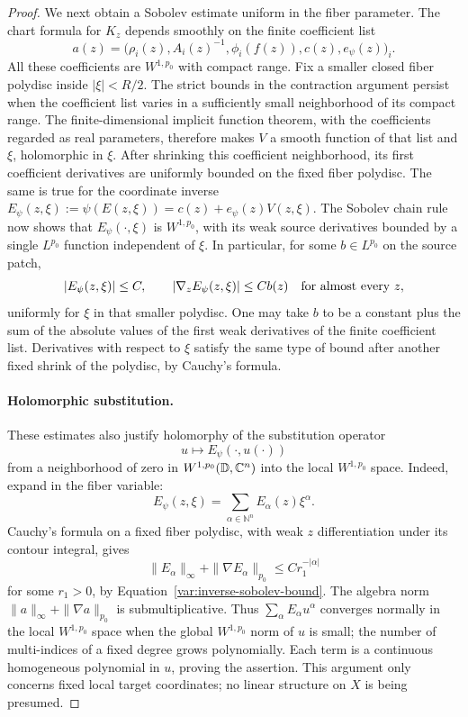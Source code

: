 \begin{proof}
We next obtain a Sobolev estimate uniform in the fiber parameter.
The chart formula for $K_z$ depends smoothly on the finite coefficient list
\[
 a(z)=\bigl(\rho_i(z),A_i(z)^{-1},\phi_i(f(z)),
                 c(z),e_\psi(z)\bigr)_i.
\]
All these coefficients are $W^{1,p_0}$ with compact range.  Fix a
smaller closed fiber polydisc inside $|\xi|<R/2$.  The strict bounds
in the contraction argument persist when the coefficient list varies
in a sufficiently small neighborhood of its compact range.  The
finite-dimensional implicit function theorem, with the coefficients
regarded as real parameters, therefore makes $V$ a smooth function of
that list and $\xi$, holomorphic in $\xi$.  After shrinking this
coefficient neighborhood, its first coefficient derivatives are
uniformly bounded on the fixed fiber polydisc.  The same is true for
the coordinate inverse
$E_\psi(z,\xi):=\psi(E(z,\xi))=c(z)+e_\psi(z)V(z,\xi)$.
The Sobolev chain rule now shows that $E_\psi(\cdot,\xi)$ is
$W^{1,p_0}$, with its weak source derivatives bounded by a single
$L^{p_0}$ function independent of $\xi$.  In particular, for some
$b\in L^{p_0}$ on the source patch,
\begin{equation}\label{var:inverse-sobolev-bound}
 |E_\psi(z,\xi)|\le C,
 \qquad |\nabla_zE_\psi(z,\xi)|\le C b(z)
 \quad\hbox{for almost every }z,
\end{equation}
uniformly for $\xi$ in that smaller polydisc.  One may take $b$ to
be a constant plus the sum of the absolute values of the first weak
derivatives of the finite coefficient list.  Derivatives with respect
to $\xi$ satisfy the same type of bound after another fixed shrink
of the polydisc, by Cauchy's formula.

\paragraph{Holomorphic substitution.}
These estimates also justify holomorphy of the substitution operator
\begin{equation}\label{var:inverse-substitution}
 u\longmapsto E_\psi(\cdot,u(\cdot))
\end{equation}
from a neighborhood of zero in $W^{1,p_0}(\mathbb D,\mathbb C^n)$ into the local
$W^{1,p_0}$ space.  Indeed, expand in the fiber variable:
\[
 E_\psi(z,\xi)=\sum_{\alpha\in\mathbb N^n}E_\alpha(z)\xi^\alpha.
\]
Cauchy's formula on a fixed fiber polydisc, with weak $z$
differentiation under its contour integral, gives
\[
 \|E_\alpha\|_\infty+\|\nabla E_\alpha\|_{p_0}
       \le Cr_1^{-|\alpha|}
\]
for some $r_1>0$, by Equation~\eqref{var:inverse-sobolev-bound}.
The algebra norm $\|a\|_\infty+\|\nabla a\|_{p_0}$ is submultiplicative.
Thus $\sum_\alpha E_\alpha u^\alpha$ converges normally in the
local $W^{1,p_0}$ space when the global $W^{1,p_0}$ norm of $u$ is small;
the number of multi-indices of a fixed degree grows polynomially.
Each term is a continuous
homogeneous polynomial in $u$, proving the assertion.  This argument
only concerns fixed local target coordinates; no linear structure on
$X$ is being presumed.


\end{proof}
